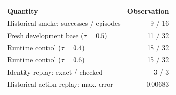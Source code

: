 \begin{tabularx}{\linewidth}{@{}Xr@{}}
\toprule
Quantity & Observation \\
\midrule
Historical smoke: successes / episodes & 9 / 16 \\
Fresh development base ($\tau=0.5$) & 11 / 32 \\
Runtime control ($\tau=0.4$) & 18 / 32 \\
Runtime control ($\tau=0.6$) & 15 / 32 \\
Identity replay: exact / checked & 3 / 3 \\
Historical-action replay: max. error & 0.00683 \\
\bottomrule
\end{tabularx}
